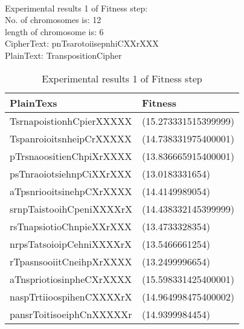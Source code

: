 \\\textsf{Experimental results 1 of Fitness step:}\\
    \colorbox{blue!30}{\textsf{     No. of chromosomes is: 12}}\\
    \colorbox{blue!30}{\textsf{     length of chromosome is: 6}}\\
    \colorbox{blue!30}{\textsf{     CipherText: pnTsarotoiisepnhiCXXrXXX}}\\
    \colorbox{blue!30}{\textsf{     PlainText: TranspositionCipher}}

\begin{table}[h!]
\centering
\begin{tabular}{l l}
    \hline
    \cellcolor[gray]{0.9} PlainTexs& \cellcolor[gray]{0.9} Fitness\\ \hline
    TsrnapoistionhCpierXXXXX &(15.273331515399999)\\ \hline
    TspanroioitsnheipCrXXXXX &(14.738331975400001) \\ \hline
    pTrsnaoositienChpiXrXXXX &(13.836665915400001) \\ \hline
    psTnraoiotsiehnpCiXXrXXX &(13.0183331654) \\ \hline
    aTpsnriooitsinehpCXrXXXX &(14.4149989054) \\ \hline
    srnpTaistooihCpeniXXXXrX &(14.438332145399999)\\ \hline
    rsTnapsiotioChnpieXXrXXX &(13.4733328354) \\ \hline
    nrpsTatsoioipCehniXXXXrX &(13.5466661254) \\ \hline
    rTpasnsooiitCneihpXrXXXX &(13.2499996654) \\ \hline
    aTnspriotiosinpheCXrXXXX &(15.598331425400001) \\ \hline
    naspTrtiioospihenCXXXXrX &(14.964998475400002)\\ \hline
    pansrToitisoeiphCnXXXXXr &(14.9399984454) \\ \hline
\end{tabular}
\caption{Experimental results 1 of Fitness step}

\end{table}


